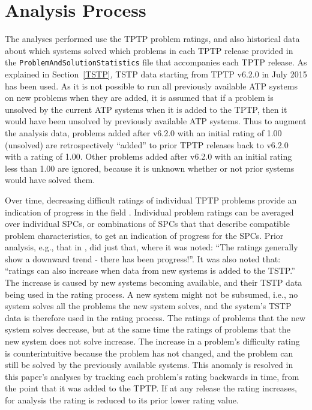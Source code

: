 \documentclass[runningheads]{llncs}
\begin{document}
\section{Analysis Process}
\label{Analysis}

The analyses performed use the TPTP problem ratings, and also historical data about which
systems solved which problems in each TPTP release provided in the 
{\tt ProblemAndSolutionStatistics} file that accompanies each TPTP release.
As explained in Section~\ref{TSTP}, TSTP data starting from TPTP v6.2.0 in July 2015 has been
used.
As it is not possible to run all previously available ATP systems on new problems when they 
are added, it is assumed that if a problem is unsolved by the current ATP systems when it is 
added to the TPTP, then it would have been unsolved by previously available ATP systems.
Thus to augment the analysis data, problems added after v6.2.0 with an initial rating of 1.00 
(unsolved) are retrospectively ``added'' to prior TPTP releases back to v6.2.0 with a rating 
of 1.00.
Other problems added after v6.2.0 with an initial rating less than 1.00 are ignored, because 
it is unknown whether or not prior systems would have solved them.

Over time, decreasing difficult ratings of individual TPTP problems provide an indication of 
progress in the field \cite{SFS01}.
Individual problem ratings can be averaged over individual SPCs, or combinations of SPCs that
that describe compatible problem characteristics, to get an indication of progress for the SPCs.
Prior analysis, e.g., that in \cite{Sut17}, did just that,
where it was noted: ``The ratings generally show a downward trend - there has been progress!''.
It was also noted that:
``ratings can also increase when data from new systems is added to the TSTP.''
The increase is caused by new systems becoming available, and their TSTP data being used in 
the rating process.
A new system might not be subsumed, i.e., no system solves all the problems the new system solves, 
and the system's TSTP data is therefore used in the rating process.
The ratings of problems that the new system solves decrease, but at the same time the ratings of
problems that the new system does not solve increase.
The increase in a problem's difficulty rating is counterintuitive because the problem has not 
changed, and the problem can still be solved by the previously available systems.
This anomaly is resolved in this paper's analyses by tracking each problem's rating backwards 
in time, from the point that it was added to the TPTP.
If at any release the rating increases, for analysis the rating is reduced to its prior
lower rating value.
\end{document}
